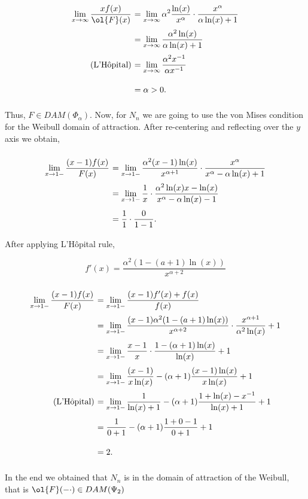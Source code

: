 \[ \everymath{\displaystyle}
\arraycolsep=1.8pt\def\arraystretch{2.5}
\begin{array}{rl}
    \lim_{x\to\infty} \frac{xf(x)}{\ol{F}(x)}  
    & = \lim_{x\to\infty} \alpha^2\frac{\ln(x)}{x^{\alpha}} \cdot \frac{x^{\alpha}}{\alpha\ln(x) + 1}\\
    & = \lim_{x\to\infty} \frac{\alpha^2 \ln(x)}{\alpha\ln(x)+1}\\ (\text{L'Hôpital})
    & = \lim_{x\to\infty} \frac{\alpha^2 x^{-1}}{\alpha x^{-1}}\\
    & = \alpha > 0.
\end{array}\]

Thus, $F \in DAM(\Phi_\alpha)$. Now, for $N_n$ we are going to use the von Mises condition for the Weibull domain of attraction. After re-centering and reflecting over the $y$ axis we obtain,

\[ \everymath{\displaystyle}
\arraycolsep=1.8pt\def\arraystretch{2.5}
\begin{array}{rl}
    \lim_{x\to 1-} \frac{(x-1)f(x)}{F(x)} 
    & = \lim_{x\to 1-} \frac{\alpha^2 (x-1)\ln(x)}{x^{\alpha+1}} \cdot \frac{x^{\alpha}}{x^{\alpha} - \alpha \ln(x) + 1}\\
    & = \lim_{x\to 1-} \frac{1}{x} \cdot \frac{\alpha^2 \ln(x)x -\ln(x)}{x^\alpha-\alpha\ln(x) - 1}\\
    & = \frac{1}{1} \cdot \frac{0}{1-1}.
\end{array} \]

After applying L'Hôpital rule,

\[ f'(x) = \frac{\alpha^2 (1 - (a+1)\ln(x))}{x^{\alpha+2}} \]

\[ \everymath{\displaystyle}
\arraycolsep=1.8pt\def\arraystretch{2.5}
\begin{array}{rl}
    \lim_{x\to 1-} \frac{(x-1)f(x)}{F(x)} 
    & = \lim_{x\to 1-} \frac{(x-1)f'(x) + f(x)}{f(x)}\\
    & = \lim_{x\to 1-} \frac{(x-1)\alpha^2 (1 - (a+1)\ln(x))}{x^{\alpha+2}} \cdot  \frac{x^{\alpha+1}}{\alpha^2\ln(x)} + 1\\
    & = \lim_{x\to 1-} \frac{x-1}{x} \cdot \frac{1-(\alpha + 1)\ln(x)}{\ln(x)} + 1\\
    & = \lim_{x\to 1-} \frac{(x-1)}{x\ln(x)} - (\alpha + 1)\frac{(x-1)\ln(x)}{x \ln(x)} + 1\\ \text{(L'Hôpital)}
    & = \lim_{x\to 1-} \frac{1}{\ln(x) + 1} - (\alpha + 1)\frac{1+\ln(x)-x^{-1}}{\ln(x)+1} + 1\\
    & = \frac{1}{0+1} - (\alpha+1) \frac{1+0-1}{0+1} + 1\\
    & = 2.
\end{array} \]

In the end we obtained that $N_n$ is in the domain of attraction of the Weibull, that is $\ol{F}(-\cdot)\in DAM(\Psi_2)$


